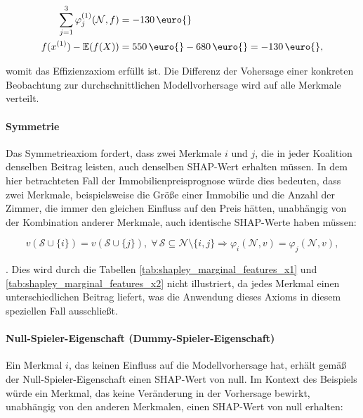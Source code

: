 \begin{align}
    \sum_{j=1}^{3}\varphi_j^{(1)}(\mathcal{N}, f) &=  -130\text{\,\euro{}} \\ \notag
    f(x^{(1)}) - \mathbb{E}(f(X)) &= 550\text{\,\euro{}} - 680\text{\,\euro{}} = -130\text{\,\euro{}},   
\end{align}

womit das Effizienzaxiom erfüllt ist. Die Differenz der Vohersage 
einer konkreten Beobachtung zur durchschnittlichen 
Modellvorhersage wird auf alle Merkmale verteilt.

\paragraph{\rmfamily\bfseries Symmetrie}

Das Symmetrieaxiom fordert, dass zwei Merkmale $i$ und $j$, die 
in jeder Koalition denselben Beitrag leisten, auch denselben SHAP-Wert 
erhalten müssen. In dem hier betrachteten Fall der Immobilienpreisprognose 
würde dies bedeuten, dass zwei Merkmale, beispielsweise die Größe einer 
Immobilie und die Anzahl der Zimmer, die immer den gleichen Einfluss auf den Preis hätten, 
unabhängig von der Kombination anderer Merkmale, auch identische SHAP-Werte haben müssen:

\begin{equation}
    v(\mathcal{S} \cup \{i\}) = v(\mathcal{S} \cup \{j\}), \; \forall\, \mathcal{S} \subseteq \mathcal{N} \setminus \{i, j\} \Rightarrow \varphi_i (\mathcal{N}, v) = \varphi_j (\mathcal{N}, v),
\end{equation}

\cite[S. 221]{Molnar_2022}. Dies wird durch die Tabellen \ref{tab:shapley_marginal_features_x1} und \ref{tab:shapley_marginal_features_x2} 
nicht illustriert, da jedes Merkmal einen unterschiedlichen Beitrag liefert, 
was die Anwendung dieses Axioms in diesem speziellen Fall ausschließt.

\paragraph{\rmfamily\bfseries Null-Spieler-Eigenschaft (Dummy-Spieler-Eigenschaft)}

Ein Merkmal $i$, das keinen Einfluss auf die Modellvorhersage hat, erhält gemäß der 
Null-Spieler-Eigenschaft einen SHAP-Wert von null. 
Im Kontext des Beispiels würde ein Merkmal, das keine Veränderung in der Vorhersage 
bewirkt, unabhängig von den anderen Merkmalen, einen SHAP-Wert von null erhalten:

